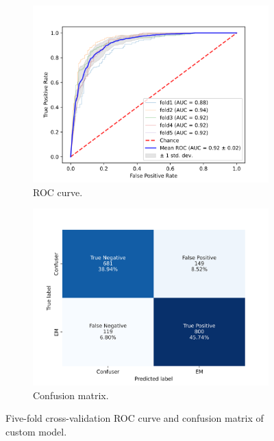 \begin{figure}[h!]
	\centering
	\begin{subfigure}[b]{0.49\textwidth}
		\centering
		\includegraphics[width=\textwidth,keepaspectratio]{images/ongoing/custom_roc.png}
		\caption{ROC curve.}
	\end{subfigure}
	\hfill
	\begin{subfigure}[b]{0.49\textwidth}
		\centering
		\includegraphics[width=\textwidth,keepaspectratio]{images/ongoing/custom_CM.png}
		\caption{Confusion matrix.}
	\end{subfigure}
	\caption{Five-fold cross-validation ROC curve and confusion matrix of custom model.}
\end{figure}
\vfill\clearpage
